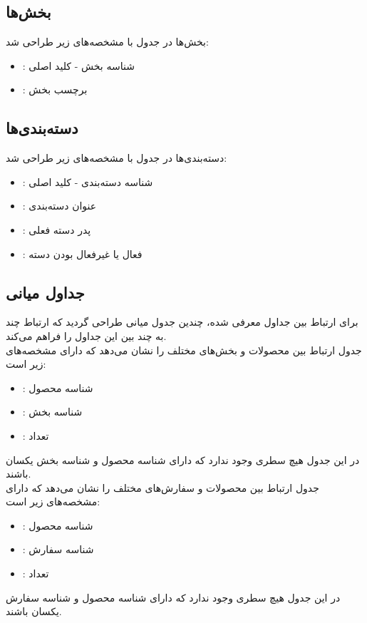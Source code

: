 \subsection{بخش‌ها}
بخش‌ها در جدول  با مشخصه‌های زیر طراحی شد:
\begin{itemize}
   	\item \textbf{}: شناسه بخش - کلید اصلی
   	\item \textbf{}: برچسب بخش
\end{itemize}

\subsection{دسته‌بندی‌ها}
دسته‌بندی‌ها در جدول  با مشخصه‌های زیر طراحی شد:
\begin{itemize}
   	\item \textbf{}: شناسه دسته‌بندی - کلید اصلی
   	\item \textbf{}: عنوان دسته‌بندی
   	\item \textbf{}: پدر دسته فعلی
   	\item \textbf{}: فعال یا غیرفعال بودن دسته
\end{itemize}

\subsection{جداول میانی}
برای ارتباط بین جداول معرفی شده، چندین جدول میانی طراحی گردید که ارتباط چند به چند بین این جداول را فراهم می‌کند.\\
جدول  ارتباط بین محصولات و بخش‌های مختلف را نشان می‌دهد که دارای مشخصه‌های زیر است:
\begin{itemize}
   	\item \textbf{}: شناسه محصول
   	\item \textbf{}: شناسه بخش
   	\item \textbf{}: تعداد
\end{itemize}
در این جدول هیچ سطری وجود ندارد که دارای شناسه محصول و شناسه بخش یکسان باشند.\\

جدول  ارتباط بین محصولات و سفارش‌های مختلف را نشان می‌دهد که دارای مشخصه‌های زیر است:
\begin{itemize}
   	\item \textbf{}: شناسه محصول
   	\item \textbf{}: شناسه سفارش
   	\item \textbf{}: تعداد
\end{itemize}
در این جدول هیچ سطری وجود ندارد که دارای شناسه محصول و شناسه سفارش یکسان باشند.\\

